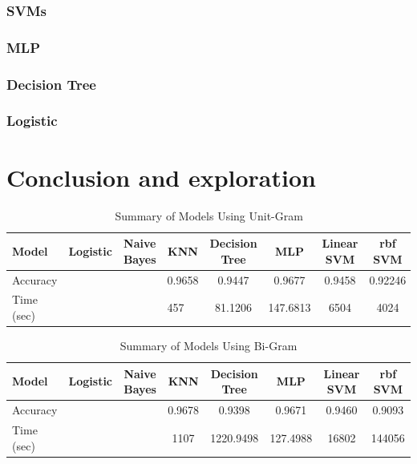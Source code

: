 \documentclass[12pt]{article}
\begin{document}
\subsubsection{SVMs}

\subsubsection{MLP}

\subsubsection{Decision Tree}

\subsubsection{Logistic}


\section{Conclusion and exploration}


\begin{table}[H]
	\centering
	\caption{Summary of Models Using Unit-Gram}
	\label{Summary-one-gram}
	\begin{tabular}{lccccccc}
		\hline
		Model      & Logistic             & Naive Bayes          & KNN                     & Decision Tree & MLP                  & Linear SVM & rbf SVM \\ \hline
		Accuracy   &                      &                      & 0.9658                  & 0.9447        &        0.9677              & 0.9458     & 0.92246 \\
		Time (sec) & \multicolumn{1}{l}{} & \multicolumn{1}{l}{} & \multicolumn{1}{l}{457} & 81.1206       & \multicolumn{1}{l}{147.6813} & 6504       & 4024    \\ \hline
	\end{tabular}
\end{table}


\begin{table}[H]
	\centering
	\caption{Summary of Models Using Bi-Gram}
	\label{Summary-bi-gram}
	\begin{tabular}{lccccccc}
		\hline
		Model      & Logistic & Naive Bayes & KNN    & Decision Tree & MLP & Linear SVM & rbf SVM \\ \hline
		Accuracy   &          &             & 0.9678 & 0.9398        &     0.9671 & 0.9460     & 0.9093  \\
		Time (sec) &          &             & 1107   & 1220.9498     &    127.4988 & 16802      & 144056  \\ \hline
	\end{tabular}
\end{table}
\end{document}
